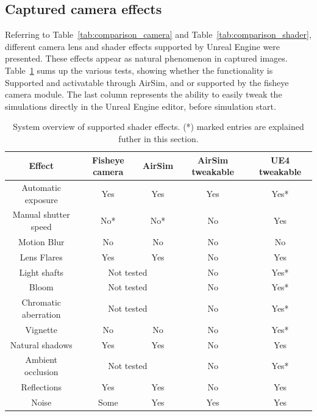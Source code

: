 \subsection{Captured camera effects}

Referring to Table~\ref{tab:comparison_camera} and Table~\ref{tab:comparison_shader}, different camera lens and shader effects supported by Unreal Engine were presented. These effects appear as natural phenomenon in captured images. Table~\ref{tab:res_shader_effects} sums up the various tests, showing whether the functionality is Supported and activatable through AirSim, and or supported by the fisheye camera module. The last column represents the ability to easily tweak the simulations directly in the Unreal Engine editor, before simulation start.

\begin{table}[!htb]
    \centering
    \caption{System overview of supported shader effects. (*) marked entries are explained futher in this section.}
    \label{tab:res_shader_effects}
    \begin{tabular}{|c|c|c|c|c|} \hline
        \textbf{Effect} & Fisheye camera & AirSim & AirSim tweakable & UE4 tweakable \\ \hline \hline
        Automatic exposure & Yes & Yes & Yes & Yes* \\ \hline                 
        Manual shutter speed & No* & No* & No & Yes \\ \hline
        Motion Blur & No & No & No & No \\ \hline
        Lens Flares & Yes & Yes & No & Yes \\ \hline
        Light shafts & \multicolumn{2}{c|}{Not tested} & No & Yes* \\ \hline
        Bloom & \multicolumn{2}{c|}{Not tested} & No & Yes* \\ \hline
        Chromatic aberration & \multicolumn{2}{c|}{Not tested} & No & Yes* \\ \hline
        Vignette & No & No & No & Yes* \\ \hline
        Natural shadows & Yes & Yes & No & Yes \\ \hline
        Ambient occlusion & \multicolumn{2}{c|}{Not tested} & No & Yes* \\ \hline
        Reflections & Yes & Yes & No & Yes \\ \hline
        Noise & Some & Yes & Yes & Yes \\ \hline
        
    \end{tabular}
\end{table}

